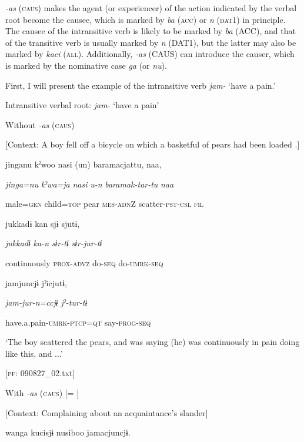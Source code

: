 \textit{{}-as} (\textsc{caus}) makes the agent (or experiencer) of the action indicated by the verbal root become the causee, which is marked by \textit{ba} (\textsc{acc}) or \textit{n} (\textsc{dat}1) in principle. The causee of the intransitive verb is likely to be marked by \textit{ba} (ACC), and that of the transitive verb is usually marked by \textit{n} (DAT1), but the latter may also be marked by \textit{kaci} (\textsc{all}). Additionally, \textit{{}-as} (CAUS) can introduce the causer, which is marked by the nominative case \textit{ga} (or \textit{nu}).

  First, I will present the example of the intransitive verb \textit{jam-} ‘have a pain.’

\textbf{\ea\label{ex:8-119}
}  Intransitive verbal root: \textit{jam-} ‘have a pain’

\ea Without \textit{-as} (\textsc{caus})

  [Context: A boy fell off a bicycle on which a basketful of pears had been loaded .]

  {\TM}
\glll  jinganu  kˀwoo  nasi  (un)  baramacjattu,  naa,

    \textit{jinga=nu}  \textit{kˀwa=ja}  \textit{nasi}  \textit{u-n}  \textit{baramak-tar-tu}  \textit{naa}

    male=\textsc{gen}  child=\textsc{top}  pear  \textsc{mes}-\textsc{adn}Z  scatter-\textsc{pst}-\textsc{csl}  \textsc{fil}

    jukkadɨ  kan  sjɨ  sjutɨ,

    \textit{jukkadɨ}  \textit{ka-n}  \textit{sɨr-tɨ}  \textit{sɨr-jur-tɨ}

    continuously  \textsc{prox}-\textsc{advz}  do-\textsc{seq}  do-\textsc{umrk}-\textsc{seq}

    jamjuncjɨ  jˀicjutɨ,

    \textit{jam{}-jur-n=ccjɨ  jˀ-tur-tɨ}

    have.a.pain-\textsc{umrk}-\textsc{ptcp}=\textsc{qt}  say-\textsc{prog}-\textsc{seq}

    ‘The boy scattered the pears, and was saying (he) was continuously in pain doing like this, and ...’

    [\textsc{pf}: 090827\_02.txt]
\z

\ex With \textit{-as} (\textsc{caus}) [= ]

  [Context: Complaining about an acquaintance’s slander]

  {\TM}
\glll  wanga  kucisjɨ  nusiboo  jamacjuncjɨ.


